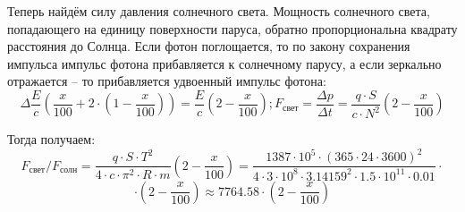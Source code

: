 Теперь найдём силу давления солнечного света. Мощность солнечного света, попадающего на единицу поверхности паруса, 
обратно пропорциональна квадрату расстояния до Солнца.  Если фотон поглощается, то по закону сохранения импульса импульс фотона прибавляется к солнечному парусу, а если зеркально отражается – то прибавляется удвоенный импульс фотона:
$$\Delta \frac{E}{c} \left( \frac{x}{100}+2 \cdot \left(1-\frac{x}{100} \right) \right)=\frac{E}{c} \left(2-\frac{x}{100}\right); F_{\text{свет}}=  \frac{\Delta p}{\Delta t}=\frac{q \cdot S}{c \cdot N^2} \left(2-\frac{x}{100}\right) $$

Тогда получаем:
  $$F_{\text{свет}}/F_{\text{солн}} = \frac{q \cdot S \cdot T^2}{4 \cdot c \cdot \pi^2 \cdot R \cdot m} \left(2-\frac{x}{100}\right)=\frac{1387 \cdot 10^5 \cdot (365 \cdot 24 \cdot 3600)^2}{4 \cdot 3 \cdot 10^8 \cdot 3.14159^2 \cdot 1.5 \cdot 10^{11} \cdot 0.01} \cdot$$  
  $$\cdot \left(2-\frac{x}{100}\right) \approx 7764.58 \cdot (2-\frac{x}{100})$$

